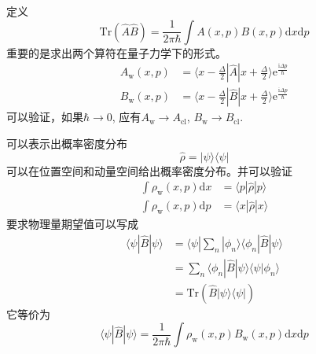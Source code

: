 \documentclass[12pt]{article}
\begin{document}
    定义
    \begin{equation}
        \mathrm{Tr} (\hat{A}\hat{B}) = \frac 1{2\pi\hbar}\int A(x,p)B(x,p) \mathrm{d}x \mathrm{d}p
    \end{equation}
    重要的是求出两个算符在量子力学下的形式。
    \begin{equation}\begin{aligned}
        A_\mathrm{w}(x,p) &= \langle x - \frac {\Delta}2 | \hat{A} | x + \frac {\Delta}2 \rangle \mathrm{e}^{\frac {\mathrm{i}\Delta p}{\hbar}}\\
        B_\mathrm{w}(x,p) &= \langle x - \frac {\Delta}2 | \hat{B} | x + \frac {\Delta}2 \rangle \mathrm{e}^{\frac {\mathrm{i}\Delta p}{\hbar}}
    \end{aligned}\end{equation}
    可以验证，如果$\hbar \to 0$, 应有$A_\mathrm{w} \to A_\mathrm{cl}$, $B_\mathrm{w} \to B_\mathrm{cl}$. 

    可以表示出概率密度分布
    \begin{equation}
        \hat{\rho} = |\psi \rangle \langle \psi |
    \end{equation}
    可以在位置空间和动量空间给出概率密度分布。并可以验证
    \begin{equation}\begin{aligned}
        \int \rho_\mathrm{w}(x,p) \mathrm{d}x &= \langle p|\hat{\rho}|p \rangle\\
        \int \rho_\mathrm{w}(x,p) \mathrm{d}p &= \langle x|\hat{\rho}|x \rangle
    \end{aligned}\end{equation}
    要求物理量期望值可以写成
    \begin{equation}\begin{aligned}
        \langle \psi | \hat{B} | \psi \rangle &=  \langle \psi |\sum_n | \phi_n \rangle \langle \phi_n | \hat{B} | \psi \rangle\\
        &= \sum_n \langle \phi_n | \hat{B} | \psi \rangle \langle \psi  | \phi_n \rangle\\
        &= \mathrm{Tr} (\hat{B}|\psi \rangle \langle \psi |)
    \end{aligned}\end{equation}
    它等价为
    \begin{equation}
        \langle \psi|\hat{B}|\psi \rangle = \frac 1{2\pi \hbar} \int \rho_\mathrm{w}(x,p) B_\mathrm{w}(x,p) \mathrm{d}x\mathrm{d}p
    \end{equation}    
\end{document}
